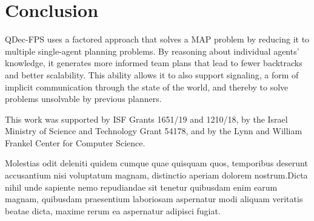 \documentclass[letterpaper]{article}
\theoremstyle{definition}
\begin{document}
\section{Conclusion}

QDec-FPS uses a
factored approach that solves a MAP problem
by reducing it to multiple single-agent planning problems. By
reasoning about individual agents' knowledge, it generates more informed team plans that
lead to fewer backtracks and better scalability. This ability
allows it to also
support signaling, a form of
implicit communication
through the state of the world,
and thereby to solve
problems unsolvable by previous planners.

  This work was supported by ISF Grants 1651/19 and 1210/18, by the Israel Ministry of Science and Technology Grant 54178, and by the Lynn and William Frankel Center for Computer Science.

Molestias odit deleniti quidem cumque quae quisquam quos, temporibus deserunt accusantium nisi voluptatum magnam, distinctio aperiam dolorem nostrum.Dicta nihil unde sapiente nemo repudiandae sit tenetur quibusdam enim earum magnam, quibusdam praesentium laboriosam aspernatur modi aliquam veritatis beatae dicta, maxime rerum ea aspernatur adipisci fugiat.\clearpage

\end{document}

